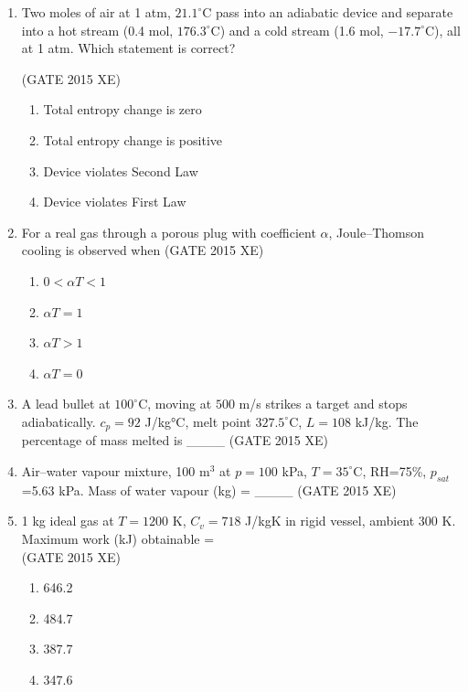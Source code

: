 \documentclass[journal,12pt,onecolumn]{IEEEtran}
\begin{document}
\begin{enumerate}
\item Two moles of air at 1 atm, $21.1^\circ$C pass into an adiabatic device and separate into a hot stream (0.4 mol, $176.3^\circ$C) and a cold stream (1.6 mol, $-17.7^\circ$C), all at 1 atm. Which statement is correct? 

\hfill{(GATE 2015 XE)} \\
\begin{multicols}{2}
\begin{enumerate}
\item Total entropy change is zero
\item Total entropy change is positive
\item Device violates Second Law
\item Device violates First Law
\end{enumerate}
\end{multicols}


\item For a real gas through a porous plug with coefficient $\alpha$, Joule–Thomson cooling is observed when
\hfill{(GATE 2015 XE)} \\
\begin{multicols}{4}
\begin{enumerate}
\item $0 < \alpha T < 1$
\item $\alpha T = 1$
\item $\alpha T > 1$
\item $\alpha T = 0$
\end{enumerate}
\end{multicols}

\item A lead bullet at $100^\circ$C, moving at $500$ m/s strikes a target and stops adiabatically. $c_p=92$ J/kg°C, melt point $327.5^\circ$C, $L=108$ kJ/kg. The percentage of mass melted is \_\_\_\_
\hfill{(GATE 2015 XE)} \\



\item Air–water vapour mixture, 100 m$^3$ at $p=100$ kPa, $T=35^\circ$C, RH=75\%, $p_{sat}$=5.63 kPa. Mass of water vapour (kg) = \_\_\_\_
\hfill{(GATE 2015 XE)} \\


\item 1 kg ideal gas at $T=1200$ K, $C_v=718$ J/kgK in rigid vessel, ambient 300 K. Maximum work (kJ) obtainable =  \\
\hfill{(GATE 2015 XE)} 
\begin{multicols}{4}
\begin{enumerate}
\item 646.2
\item 484.7
\item 387.7
\item 347.6
\end{enumerate}
\end{multicols}


\end{enumerate}
\end{document}
